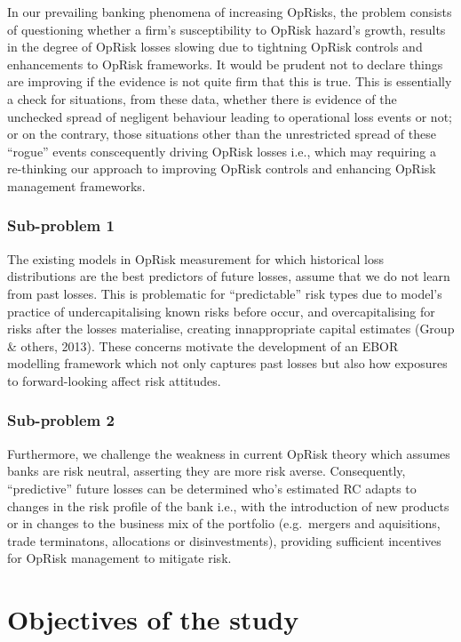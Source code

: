 \documentclass{DissertateUSU}
\begin{document}
In our prevailing banking phenomena of increasing OpRisks, the problem
consists of questioning whether a firm's susceptibility to OpRisk
hazard's growth, results in the degree of OpRisk losses slowing due to
tightning OpRisk controls and enhancements to OpRisk frameworks. It
would be prudent not to declare things are improving if the evidence is
not quite firm that this is true. This is essentially a check for
situations, from these data, whether there is evidence of the unchecked
spread of negligent behaviour leading to operational loss events or not;
or on the contrary, those situations other than the unrestricted spread
of these ``rogue'' events conscequently driving OpRisk losses i.e.,
which may requiring a re-thinking our approach to improving OpRisk
controls and enhancing OpRisk management frameworks.

\subsubsection{Sub-problem 1}
\label{sssec:Sub-problem 1}

The existing models in OpRisk measurement for which historical loss
distributions are the best predictors of future losses, assume that we
do not learn from past losses. This is problematic for ``predictable''
risk types due to model's practice of undercapitalising known risks
before occur, and overcapitalising for risks after the losses
materialise, creating innappropriate capital estimates (Group \& others,
2013). These concerns motivate the development of an EBOR modelling
framework which not only captures past losses but also how exposures to
forward-looking affect risk attitudes.

\subsubsection{Sub-problem 2}
\label{sssec:Sub-problem 2}

Furthermore, we challenge the weakness in current OpRisk theory which
assumes banks are risk neutral, asserting they are more risk averse.
Consequently, ``predictive'' future losses can be determined who's
estimated RC adapts to changes in the risk profile of the bank i.e.,
with the introduction of new products or in changes to the business mix
of the portfolio (e.g.~mergers and aquisitions, trade terminatons,
allocations or disinvestments), providing sufficient incentives for
OpRisk management to mitigate risk.

\section{Objectives of the study}
\label{sec:Objectives of the study}
\end{document}
